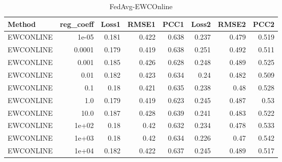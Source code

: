 \begin{table}
\caption{FedAvg-EWCOnline}
\begin{tabular}{lrrrrrrr}
\toprule
Method & reg_coeff & Loss1 & RMSE1 & PCC1 & Loss2 & RMSE2 & PCC2 \\
\midrule
EWCONLINE & 1e-05 & 0.181 & 0.422 & 0.638 & 0.237 & 0.479 & 0.519 \\
EWCONLINE & 0.0001 & 0.179 & 0.419 & 0.638 & 0.251 & 0.492 & 0.511 \\
EWCONLINE & 0.001 & 0.185 & 0.426 & 0.628 & 0.248 & 0.489 & 0.525 \\
EWCONLINE & 0.01 & 0.182 & 0.423 & 0.634 & 0.24 & 0.482 & 0.509 \\
EWCONLINE & 0.1 & 0.18 & 0.421 & 0.635 & 0.238 & 0.48 & 0.528 \\
EWCONLINE & 1.0 & 0.179 & 0.419 & 0.623 & 0.245 & 0.487 & 0.53 \\
EWCONLINE & 10.0 & 0.187 & 0.428 & 0.639 & 0.241 & 0.483 & 0.522 \\
EWCONLINE & 1e+02 & 0.18 & 0.42 & 0.632 & 0.234 & 0.478 & 0.533 \\
EWCONLINE & 1e+03 & 0.18 & 0.42 & 0.634 & 0.226 & 0.47 & 0.542 \\
EWCONLINE & 1e+04 & 0.182 & 0.422 & 0.637 & 0.245 & 0.489 & 0.517 \\
\bottomrule
\end{tabular}
\end{table}
